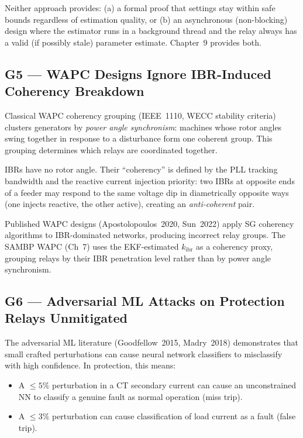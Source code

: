 \documentclass[12pt,a4paper]{article}
\newcommand{\kibr}{k_\mathrm{ibr}}
\begin{document}
Neither approach provides:
(a) a formal proof that settings stay within safe bounds regardless of estimation
quality, or (b) an asynchronous (non-blocking) design where the estimator runs
in a background thread and the relay always has a valid (if possibly stale)
parameter estimate.  Chapter~9 provides both.

\subsection{G5 --- WAPC Designs Ignore IBR-Induced Coherency Breakdown}

Classical WAPC coherency grouping (IEEE~1110, WECC stability criteria) clusters
generators by \emph{power angle synchronism}: machines whose rotor angles swing
together in response to a disturbance form one coherent group.  This grouping
determines which relays are coordinated together.

IBRs have no rotor angle.  Their ``coherency'' is defined by the PLL tracking
bandwidth and the reactive current injection priority: two IBRs at opposite ends
of a feeder may respond to the same voltage dip in diametrically opposite ways
(one injects reactive, the other active), creating an \emph{anti-coherent} pair.

Published WAPC designs (Apostolopoulos~2020, Sun~2022) apply SG coherency
algorithms to IBR-dominated networks, producing incorrect relay groups.  The SAMBP
WAPC (Ch~7) uses the EKF-estimated $\kibr$ as a coherency proxy, grouping relays
by their IBR penetration level rather than by power angle synchronism.

\subsection{G6 --- Adversarial ML Attacks on Protection Relays Unmitigated}

The adversarial ML literature (Goodfellow~2015, Madry~2018) demonstrates that
small crafted perturbations can cause neural network classifiers to misclassify
with high confidence.  In protection, this means:
\begin{itemize}[nosep]
  \item A $\leq 5\%$ perturbation in a CT secondary current can cause an
        unconstrained NN to classify a genuine fault as normal operation (miss trip).
  \item A $\leq 3\%$ perturbation can cause classification of load current as
        a fault (false trip).
\end{itemize}
\end{document}
